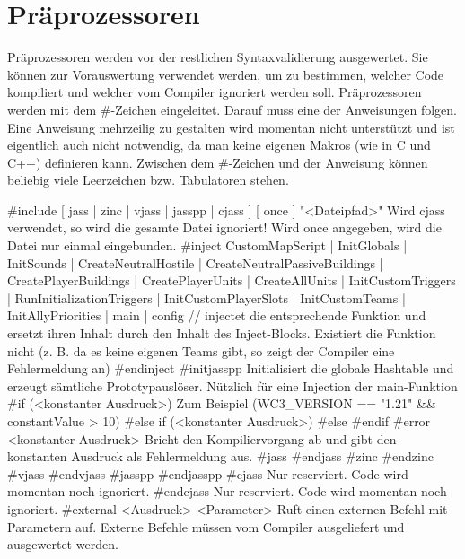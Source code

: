 \chapter { Präprozessoren }

Präprozessoren werden vor der restlichen Syntaxvalidierung ausgewertet.
Sie können zur Vorauswertung verwendet werden, um zu bestimmen, welcher Code kompiliert und welcher vom Compiler ignoriert werden soll.
Präprozessoren werden mit dem #-Zeichen eingeleitet. Darauf muss eine der Anweisungen folgen.
Eine Anweisung mehrzeilig zu gestalten wird momentan nicht unterstützt und ist eigentlich auch nicht
notwendig, da man keine eigenen Makros (wie in C und C++) definieren kann.
Zwischen dem #-Zeichen und der Anweisung können beliebig viele Leerzeichen bzw. Tabulatoren stehen.

#include [ jass | zinc | vjass | jasspp | cjass ] [ once ] "<Dateipfad>" Wird cjass verwendet, so wird die gesamte Datei ignoriert! Wird once angegeben, wird die Datei nur einmal eingebunden.
#inject CustomMapScript | InitGlobals | InitSounds | CreateNeutralHostile | CreateNeutralPassiveBuildings | CreatePlayerBuildings | CreatePlayerUnits | CreateAllUnits | InitCustomTriggers | RunInitializationTriggers | InitCustomPlayerSlots | InitCustomTeams | InitAllyPriorities | main | config // injectet die entsprechende Funktion und ersetzt ihren Inhalt durch den Inhalt des Inject-Blocks. Existiert die Funktion nicht (z. B. da es keine eigenen Teams gibt, so zeigt der Compiler eine Fehlermeldung an)
#endinject
#initjasspp				Initialisiert die globale Hashtable und erzeugt sämtliche Prototypauslöser. Nützlich für eine Injection der main-Funktion
#if (<konstanter Ausdruck>)		Zum Beispiel (WC3_VERSION == "1.21" && constantValue > 10)
#else if (<konstanter Ausdruck>)
#else
#endif
#error <konstanter Ausdruck>		Bricht den Kompiliervorgang ab und gibt den konstanten Ausdruck als Fehlermeldung aus.
#jass
#endjass
#zinc
#endzinc
#vjass
#endvjass
#jasspp
#endjasspp
#cjass					Nur reserviert. Code wird momentan noch ignoriert.
#endcjass				Nur reserviert. Code wird momentan noch ignoriert.
#external <Ausdruck> <Parameter>	Ruft einen externen Befehl mit Parametern auf. Externe Befehle müssen vom Compiler ausgeliefert und ausgewertet werden.

